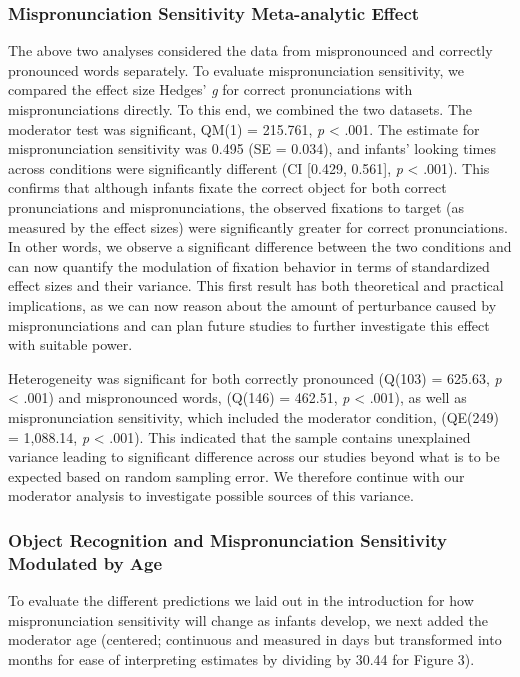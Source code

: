 \documentclass[man]{apa6}
\theoremstyle{definition}
\theoremstyle{definition}
\theoremstyle{definition}
\theoremstyle{remark}
\begin{document}
\subsubsection{Mispronunciation Sensitivity Meta-analytic
Effect}\label{mispronunciation-sensitivity-meta-analytic-effect}

The above two analyses considered the data from mispronounced and
correctly pronounced words separately. To evaluate mispronunciation
sensitivity, we compared the effect size Hedges' \emph{g} for correct
pronunciations with mispronunciations directly. To this end, we combined
the two datasets. The moderator test was significant, QM(1) = 215.761,
\emph{p} \textless{} .001. The estimate for mispronunciation sensitivity
was 0.495 (SE = 0.034), and infants' looking times across conditions
were significantly different (CI {[}0.429, 0.561{]}, \emph{p}
\textless{} .001). This confirms that although infants fixate the
correct object for both correct pronunciations and mispronunciations,
the observed fixations to target (as measured by the effect sizes) were
significantly greater for correct pronunciations. In other words, we
observe a significant difference between the two conditions and can now
quantify the modulation of fixation behavior in terms of standardized
effect sizes and their variance. This first result has both theoretical
and practical implications, as we can now reason about the amount of
perturbance caused by mispronunciations and can plan future studies to
further investigate this effect with suitable power.

Heterogeneity was significant for both correctly pronounced (Q(103) =
625.63, \emph{p} \textless{} .001) and mispronounced words, (Q(146) =
462.51, \emph{p} \textless{} .001), as well as mispronunciation
sensitivity, which included the moderator condition, (QE(249) =
1,088.14, \emph{p} \textless{} .001). This indicated that the sample
contains unexplained variance leading to significant difference across
our studies beyond what is to be expected based on random sampling
error. We therefore continue with our moderator analysis to investigate
possible sources of this variance.

\subsubsection{Object Recognition and Mispronunciation Sensitivity
Modulated by
Age}\label{object-recognition-and-mispronunciation-sensitivity-modulated-by-age}

To evaluate the different predictions we laid out in the introduction
for how mispronunciation sensitivity will change as infants develop, we
next added the moderator age (centered; continuous and measured in days
but transformed into months for ease of interpreting estimates by
dividing by 30.44 for Figure 3).
\end{document}
